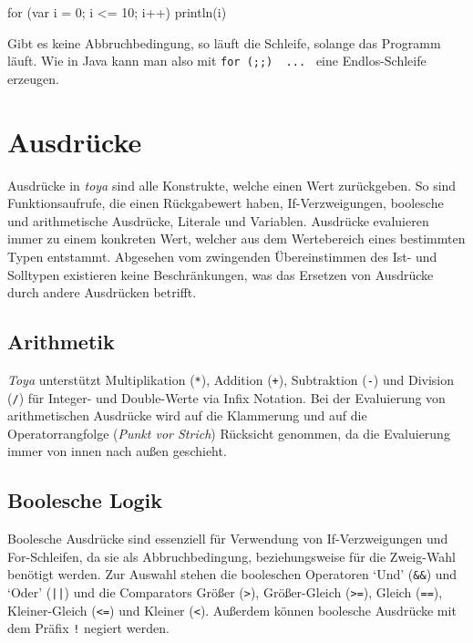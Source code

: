 \begin{ToyaCode}[numbers=none, caption={Eine For-Schleife, die die Zählvariable auf die Konsole ausgibt.}]
for (var i = 0; i <= 10; i++) {
    println(i)
}
\end{ToyaCode}

Gibt es keine Abbruchbedingung, so läuft die Schleife, solange das Programm läuft. Wie in Java kann man also mit \texttt{for (;;) { ... }} eine Endlos-Schleife erzeugen.

\section{Ausdrücke}

Ausdrücke in \textit{toya} sind alle Konstrukte, welche einen Wert zurückgeben. So sind Funktionsaufrufe, die einen Rückgabewert haben, If-Verzweigungen, boolesche und arithmetische Ausdrücke, Literale und Variablen. Ausdrücke evaluieren immer zu einem konkreten Wert, welcher aus dem Wertebereich eines bestimmten Typen entstammt. Abgesehen vom zwingenden Übereinstimmen des Ist- und Solltypen existieren keine Beschränkungen, was das Ersetzen von Ausdrücke durch andere Ausdrücken betrifft.

\subsection{Arithmetik}

\textit{Toya} unterstützt Multiplikation (\texttt{*}), Addition (\texttt{+}), Subtraktion (\texttt{-}) und Division (\texttt{/}) für Integer- und Double-Werte via Infix Notation. Bei der Evaluierung von arithmetischen Ausdrücke wird auf die Klammerung und auf die Operatorrangfolge (\textit{Punkt vor Strich}) Rücksicht genommen, da die Evaluierung immer von innen nach außen geschieht. 


\subsection{Boolesche Logik}

Boolesche Ausdrücke sind essenziell für Verwendung von If-Verzweigungen und For-Schleifen, da sie als Abbruchbedingung, beziehungsweise für die Zweig-Wahl benötigt werden. Zur Auswahl stehen die booleschen Operatoren `Und' (\texttt{\&\&}) und `Oder' (\texttt{||}) und die Comparators Größer (\texttt{>}), Größer-Gleich (\texttt{>=}), Gleich (\texttt{==}), Kleiner-Gleich (\texttt{<=}) und Kleiner (\texttt{<}). Außerdem können boolesche Ausdrücke mit dem Präfix \texttt{!} negiert werden.

